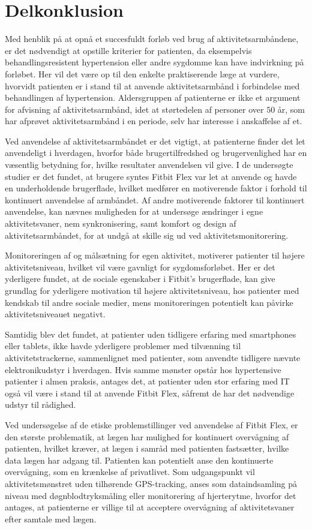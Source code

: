 \section{Delkonklusion}

Med henblik på at opnå et succesfuldt forløb ved brug af aktivitetsarmbåndene, er det nødvendigt at opstille kriterier for patienten, da eksempelvis behandlingsresistent hypertension eller andre sygdomme kan have indvirkning på forløbet. Her vil det være op til den enkelte praktiserende læge at vurdere, hvorvidt patienten er i stand til at anvende aktivitetsarmbånd i forbindelse med behandlingen af hypertension. Aldersgruppen af patienterne er ikke et argument for afvisning af aktivitetsarmbånd, idet at størtedelen af personer over $50$ år, som har afprøvet aktivitetsarmbånd i en periode, selv har interesse i anskaffelse af et.

Ved anvendelse af aktivitetsarmbåndet er det vigtigt, at patienterne finder det let anvendeligt i hverdagen, hvorfor både brugertilfredshed og brugervenlighed har en væsentlig betydning for, hvilke resultater anvendelsen vil give. I de undersøgte studier er det fundet, at brugere syntes Fitbit Flex var let at anvende og havde en underholdende brugerflade, hvilket medfører en motiverende faktor i forhold til kontinuert anvendelse af armbåndet. Af andre motiverende faktorer til kontinuert anvendelse, kan nævnes muligheden for at undersøge ændringer i egne aktivitetsvaner, nem synkronisering, samt komfort og design af aktivitetsarmbåndet, for at undgå at skille sig ud ved aktivitetsmonitorering.

Monitoreringen af og målsætning for egen aktivitet, motiverer patienter til højere aktivitetsniveau, hvilket vil være gavnligt for sygdomsforløbet. Her er det yderligere fundet, at de sociale egenskaber i Fitbit's brugerflade, kan give grundlag for yderligere motivation til højere aktivitetsniveau, hos patienter med kendskab til andre sociale medier, mens monitoreringen potentielt kan påvirke aktivitetsniveauet negativt.

Samtidig blev det fundet, at patienter uden tidligere erfaring med smartphones eller tablets, ikke havde yderligere problemer med tilvænning til aktivitetstrackerne, sammenlignet med patienter, som anvendte tidligere nævnte elektronikudstyr i hverdagen. Hvis samme mønster opstår hos hypertensive patienter i almen praksis, antages det, at patienter uden stor erfaring med IT også vil være i stand til at anvende Fitbit Flex, såfremt de har det nødvendige udstyr til rådighed. 

Ved undersøgelse af de etiske problemstillinger ved anvendelse af Fitbit Flex, er den største problematik, at lægen har mulighed for kontinuert overvågning af patienten, hvilket kræver, at lægen i samråd med patienten fastsætter, hvilke data lægen har adgang til. Patienten kan potentielt anse den kontinuerte overvågning, som en krænkelse af privatlivet. Som udgangspunkt vil aktivitetsmønstret uden tilhørende GPS-tracking, anses som dataindsamling på niveau med døgnblodtryksmåling eller monitorering af hjerterytme, hvorfor det antages, at patienterne er villige til at acceptere overvågning af aktivitetsvaner efter samtale med lægen. 